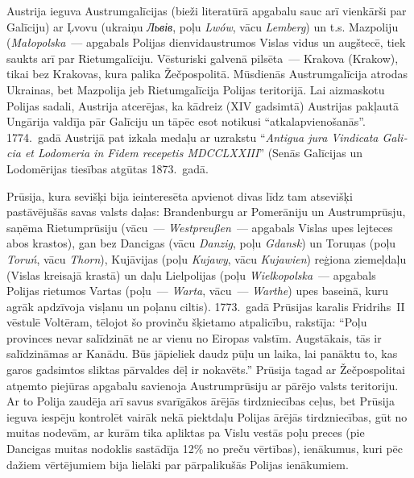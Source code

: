 \documentclass[twoside,a5paper,12pt,fleqn,openany]{extbook}
\newcommand{\pltxti}[1]{\textit{\textpolish{#1}}}
\newcommand{\detxti}[1]{\textit{\textgerman{#1}}}
\newcommand{\latxti}[1]{\textit{\textlatin{#1}}}
\newcommand{\uktxti}[1]{\textit{\textukrainian{#1}}}
\begin{document}
Austrija ieguva Austrumgalīcijas (bieži literatūrā apgabalu sauc arī vienkārši par Galīciju) ar Ļvovu (ukraiņu \uktxti{Львів}, poļu \pltxti{Lwów}, vācu \detxti{Lemberg}) un t.s. Mazpoliju (\pltxti{Małopolska}~--- apgabals Polijas dienvidaustrumos Vislas vidus un augštecē, tiek saukts arī par Rietumgalīciju. Vēsturiski galvenā pilsēta~--- Krakova (Krakow), tikai bez Krakovas, kura palika Žečpospolitā. Mūsdienās Austrumgalīcija atrodas Ukrainas, bet Mazpolija jeb Rietumgalīcija Polijas teritorijā. Lai aizmaskotu Polijas sadali, Austrija atcerējas, ka kādreiz (XIV gadsimtā) Austrijas pakļautā Ungārija valdīja pār Galīciju un tāpēc esot notikusi ``atkalapvienošanās''. 1774.~gadā Austrijā pat izkala medaļu ar uzrakstu ``\latxti{Antigua jura Vindicata Galicia et Lodomeria in Fidem recepetis MDCCLXXIII}'' (Senās Galīcijas un Lodomērijas tiesības atgūtas 1873.~gadā.

Prūsija, kura sevišķi bija ieinteresēta apvienot divas līdz tam atsevišķi pastāvējušās savas valsts daļas: Brandenburgu ar Pomerāniju un Austrumprūsju, saņēma Rietumprūsiju (vācu~--- \detxti{Westpreußen}~--- apgabals Vislas upes lejteces abos krastos), gan bez Dancigas (vācu \detxti{Danzig}, poļu \pltxti{Gdansk}) un Toruņas (poļu \pltxti{Toruń}, vācu \detxti{Thorn}), Kujāvijas (poļu \pltxti{Kujawy}, vācu \detxti{Kujawien}) reģiona ziemeļdaļu (Vislas kreisajā krastā) un daļu Lielpolijas (poļu \pltxti{Wielkopolska}~--- apgabals Polijas rietumos Vartas (poļu~--- \pltxti{Warta}, vācu~--- \detxti{Warthe}) upes baseinā, kuru agrāk apdzīvoja visļanu un poļanu ciltis). 1773.~gadā Prūsijas karalis Fridrihs~II vēstulē Voltēram, tēlojot šo provinču šķietamo atpalicību, rakstīja: ``Poļu provinces nevar salīdzināt ne ar vienu no Eiropas valstīm. Augstākais, tās ir salīdzināmas ar Kanādu. Būs jāpieliek daudz pūļu un laika, lai panāktu to, kas garos gadsimtos sliktas pārvaldes dēļ ir nokavēts.'' Prūsija tagad ar Žečpospolitai atņemto piejūras apgabalu savienoja Austrumprūsiju ar pārējo valsts teritoriju. Ar to Polija zaudēja arī savus svarīgākos ārējās tirdzniecības ceļus, bet Prūsija ieguva iespēju kontrolēt vairāk nekā piektdaļu Polijas ārējās tirdzniecības, gūt no muitas nodevām, ar kurām tika apliktas pa Vislu vestās poļu preces (pie Dancigas muitas nodoklis sastādīja 12\% no preču vērtības), ienākumus, kuri pēc dažiem vērtējumiem bija lielāki par pārpalikušās Polijas ienākumiem.
\end{document}
